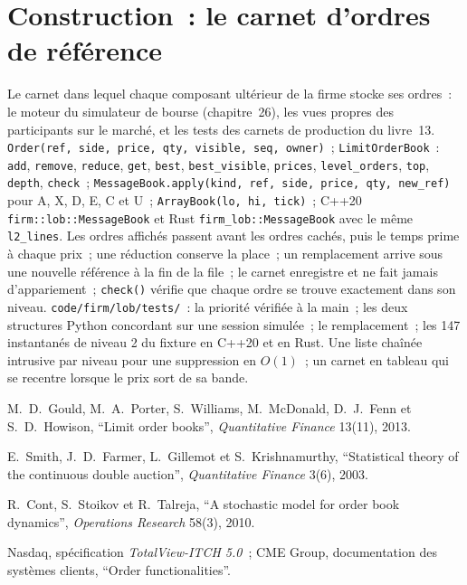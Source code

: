 \section{Construction~: le carnet d'ordres de référence}\label{bld:mx:the-limit-order-book:lob}

\begin{build}
 Le carnet dans lequel chaque composant ultérieur de la firme stocke ses ordres~: le moteur du simulateur de bourse (chapitre~26), les vues propres
des participants sur le marché, et les tests des carnets de production du livre~13.
 \texttt{Order(ref, side, price, qty, visible, seq, owner)}~; \texttt{LimitOrderBook}~: \texttt{add}, \texttt{remove}, \texttt{reduce},
\texttt{get}, \texttt{best}, \texttt{best\_visible}, \texttt{prices}, \texttt{level\_orders}, \texttt{top}, \texttt{depth}, \texttt{check}~;
\texttt{MessageBook.apply(kind, ref, side, price, qty, new\_ref)} pour A, X, D, E, C et U~; \texttt{ArrayBook(lo, hi, tick)}~; C++20
\texttt{firm::lob::MessageBook} et Rust \texttt{firm\_lob::MessageBook} avec le même \texttt{l2\_lines}.
 Les ordres affichés passent avant les ordres cachés, puis le temps prime à chaque prix~; une réduction conserve la place~; un remplacement arrive sous une nouvelle référence à la fin de la file~;
le carnet enregistre et ne fait jamais d'appariement~; \texttt{check()} vérifie que chaque ordre se trouve exactement dans son niveau.
 \texttt{code/firm/lob/tests/}~: la priorité vérifiée à la main~; les deux structures Python concordant sur une session simulée~; le remplacement~;
les 147 instantanés de niveau 2 du fixture en C++20 et en Rust.
 Une liste chaînée intrusive par niveau pour une suppression en $O(1)$~; un carnet en tableau qui se recentre lorsque le prix sort de sa bande.
\end{build}

\begin{omsources}
\item M.~D.~Gould, M.~A.~Porter, S.~Williams, M.~McDonald, D.~J.~Fenn et S.~D.~Howison, ``Limit order books'', \emph{Quantitative Finance}
13(11), 2013.
\item E.~Smith, J.~D.~Farmer, L.~Gillemot et S.~Krishnamurthy, ``Statistical theory of the continuous double auction'', \emph{Quantitative
Finance} 3(6), 2003.
\item R.~Cont, S.~Stoikov et R.~Talreja, ``A stochastic model for order book dynamics'', \emph{Operations Research} 58(3), 2010.
\item Nasdaq, spécification \emph{TotalView-ITCH 5.0}~; CME Group, documentation des systèmes clients, ``Order functionalities''.
\end{omsources}

